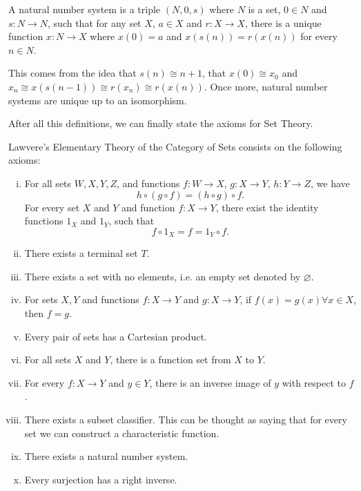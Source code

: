 \begin{definition}
    A natural number system is a triple $(N, 0, s)$ where $N$
    is a set, $0 \in N$ and $s: N\to N$, such that
    for any set $X$, $a \in X$ and $r : X \to X$, there is a unique
    function $x:N \to X$ where $x(0) = a$ and 
    $x(s(n))= r(x(n))$ for every $n \in N$.
\end{definition}
This comes from the idea that $s(n) \cong n+1$, that $x(0) \cong x_0$ and
$x_n \cong x(s(n-1)) \cong r(x_n) \cong r(x(n))$. Once more, natural
number systems are unique up to an isomorphism.

After all this definitions, we can finally state the axioms for Set Theory.
\begin{definition}[ETCS]
     Lawvere's Elementary Theory of the Category of Sets consists on the following axioms:
    \begin{enumerate}[(i)]
        \item For all sets $W,X,Y,Z$, and functions
            $f:W\to X$, $g:X\to Y$, $h:Y \to Z$, we have
            \begin{displaymath}
                h \circ (g \circ f) = (h\circ g) \circ f.
            \end{displaymath}
        For every set $X$ and $Y$ and function $f: X \to Y$, there exist the identity functions
        $1_X$ and $1_Y$, such that
            \begin{displaymath}
                f \circ 1_X = f = 1_Y \circ f.
            \end{displaymath}

        \item There exists a terminal set $T$.

        \item There exists a set with no elements, i.e. an empty set denoted by $\varnothing$.
        
        \item For sets $X,Y$ and functions $f:X \to Y$ and $g:X\to Y$, if
            $f(x) = g(x) \forall x \in X$, then $f = g$.

        \item Every pair of sets has a Cartesian product.

        \item For all sets $X$ and $Y$, there is a function set from $X$ to $Y$.

        \item For every $f : X \to Y$ and $y \in Y$, there is an inverse image
            of $y$ with respect to $f$.

        \item There exists a subset classifier. This can be thought as saying that
            for every set we can construct a characteristic function.

        \item There exists a natural number system.

        \item Every surjection has a right inverse.
    \end{enumerate}
\end{definition}


